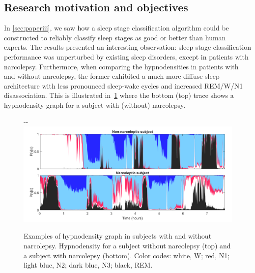 \subsection{Research motivation and objectives}

In \cref{sec:paperiii}, we saw how a sleep stage classification algorithm could be constructed to reliably classify sleep stages as good or better than human experts.
The results presented an interesting observation: sleep stage classification performance was unperturbed by existing sleep disorders, except in patients with narcolepsy.
Furthermore, when comparing the hypnodensities in patients with and without narcolepsy, the former exhibited a much more diffuse sleep architecture with less pronounced sleep-wake cycles and increased \ac{REM}/\ac{W}/\ac{N1} disassociation. 
This is illustrated in~\cref{fig:paperiii-figure03} where the bottom (top) trace shows a hypnodensity graph for a subject with (without) narcolepsy.

\begin{figure}[t]
    \begin{adjustwidth*}{}{-\marginparwidth-\marginparsep}
        \includegraphics[width=\textwidth+\marginparwidth+\marginparsep]{figures/paper-iii/Figure_3.png}
        \caption[Examples of hypnodensity graphs.]{Examples of hypnodensity graph in subjects with and without narcolepsy. 
        Hypnodensity for a subject without narcolepsy (top) and a subject with narcolepsy (bottom). 
        Color codes: white, \ac{W}; red, \ac{N1}; light blue, \ac{N2}; dark blue, \ac{N3}; black, \ac{REM}.}
        \label{fig:paperiii-figure03}
    \end{adjustwidth*}
\end{figure}

